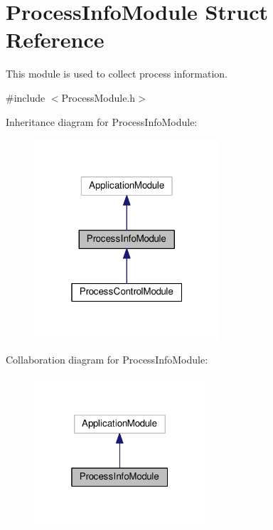\hypertarget{structProcessInfoModule}{}\section{Process\+Info\+Module Struct Reference}
\label{structProcessInfoModule}


This module is used to collect process information.  




{\ttfamily \#include $<$Process\+Module.\+h$>$}



Inheritance diagram for Process\+Info\+Module\+:
\nopagebreak
\begin{figure}[H]
\begin{center}
\leavevmode
\includegraphics[width=196pt]{structProcessInfoModule__inherit__graph}
\end{center}
\end{figure}


Collaboration diagram for Process\+Info\+Module\+:
\nopagebreak
\begin{figure}[H]
\begin{center}
\leavevmode
\includegraphics[width=181pt]{structProcessInfoModule__coll__graph}
\end{center}
\end{figure}
